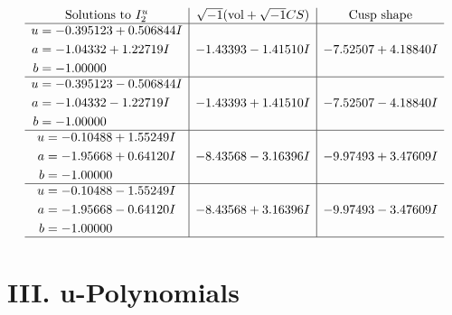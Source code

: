 \documentclass[1p]{elsarticle_modified}
\theoremstyle{definition}
\newcommand{\I}{\sqrt{-1}}
\begin{document}
$$\begin{array}{c|c|c}  
\text{Solutions to }I^u_{2}& \I (\text{vol} + \sqrt{-1}CS) & \text{Cusp shape}\\
 \hline 
\begin{aligned}
u &= -0.395123 + 0.506844 I \\
a &= -1.04332 + 1.22719 I \\
b &= -1.00000\phantom{ +0.000000I}\end{aligned}
 & -1.43393 - 1.41510 I & -7.52507 + 4.18840 I \\ \hline\begin{aligned}
u &= -0.395123 - 0.506844 I \\
a &= -1.04332 - 1.22719 I \\
b &= -1.00000\phantom{ +0.000000I}\end{aligned}
 & -1.43393 + 1.41510 I & -7.52507 - 4.18840 I \\ \hline\begin{aligned}
u &= -0.10488 + 1.55249 I \\
a &= -1.95668 + 0.64120 I \\
b &= -1.00000\phantom{ +0.000000I}\end{aligned}
 & -8.43568 - 3.16396 I & -9.97493 + 3.47609 I \\ \hline\begin{aligned}
u &= -0.10488 - 1.55249 I \\
a &= -1.95668 - 0.64120 I \\
b &= -1.00000\phantom{ +0.000000I}\end{aligned}
 & -8.43568 + 3.16396 I & -9.97493 - 3.47609 I\\
 \hline 
 \end{array}$$\newpage
\newpage\renewcommand{\arraystretch}{1}
\centering \section*{ III. u-Polynomials}
\end{document}
